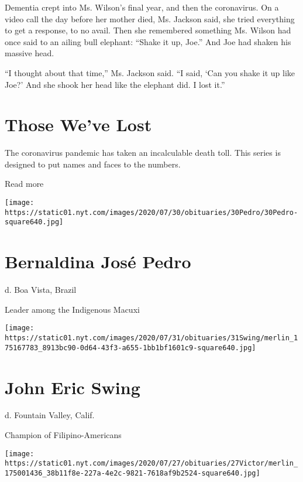 Dementia crept into Ms. Wilson's final year, and then the coronavirus.
On a video call the day before her mother died, Ms. Jackson said, she
tried everything to get a response, to no avail. Then she remembered
something Ms. Wilson had once said to an ailing bull elephant: ``Shake
it up, Joe.'' And Joe had shaken his massive head.

``I thought about that time,'' Ms. Jackson said. ``I said, `Can you
shake it up like Joe?' And she shook her head like the elephant did. I
lost it.''

\href{https://www.nytimes.com/interactive/2020/obituaries/people-died-coronavirus-obituaries.html?action=click\&pgtype=Article\&state=default\&region=BELOW_MAIN_CONTENT\&context=covid_obits_promo}{}

\hypertarget{those-weve-lost}{%
\section{Those We've Lost}\label{those-weve-lost}}

The coronavirus pandemic has taken an incalculable death toll. This
series is designed to put names and faces to the numbers.

Read more

\texttt{[image: https://static01.nyt.com/images/2020/07/30/obituaries/30Pedro/30Pedro-square640.jpg]}

\hypertarget{bernaldina-josuxe9-pedro}{%
\section{Bernaldina José Pedro}\label{bernaldina-josuxe9-pedro}}

d. Boa Vista, Brazil

Leader among the Indigenous Macuxi

\texttt{[image: https://static01.nyt.com/images/2020/07/31/obituaries/31Swing/merlin\_175167783\_8913bc90-0d64-43f3-a655-1bb1bf1601c9-square640.jpg]}

\hypertarget{john-eric-swing}{%
\section{John Eric Swing}\label{john-eric-swing}}

d. Fountain Valley, Calif.

Champion of Filipino-Americans

\texttt{[image: https://static01.nyt.com/images/2020/07/27/obituaries/27Victor/merlin\_175001436\_38b11f8e-227a-4e2c-9821-7618af9b2524-square640.jpg]}

